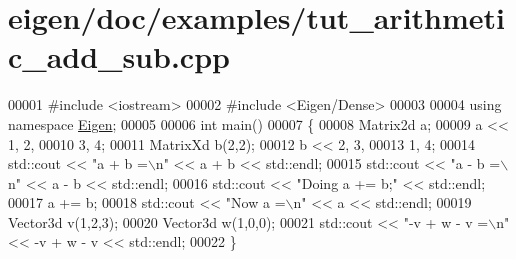 \hypertarget{eigen_2doc_2examples_2tut__arithmetic__add__sub_8cpp_source}{}\section{eigen/doc/examples/tut\+\_\+arithmetic\+\_\+add\+\_\+sub.cpp}
\label{eigen_2doc_2examples_2tut__arithmetic__add__sub_8cpp_source}

\begin{DoxyCode}
00001 \textcolor{preprocessor}{#include <iostream>}
00002 \textcolor{preprocessor}{#include <Eigen/Dense>}
00003 
00004 \textcolor{keyword}{using namespace }\hyperlink{namespace_eigen}{Eigen};
00005 
00006 \textcolor{keywordtype}{int} main()
00007 \{
00008   Matrix2d a;
00009   a << 1, 2,
00010        3, 4;
00011   MatrixXd b(2,2);
00012   b << 2, 3,
00013        1, 4;
00014   std::cout << \textcolor{stringliteral}{"a + b =\(\backslash\)n"} << a + b << std::endl;
00015   std::cout << \textcolor{stringliteral}{"a - b =\(\backslash\)n"} << a - b << std::endl;
00016   std::cout << \textcolor{stringliteral}{"Doing a += b;"} << std::endl;
00017   a += b;
00018   std::cout << \textcolor{stringliteral}{"Now a =\(\backslash\)n"} << a << std::endl;
00019   Vector3d v(1,2,3);
00020   Vector3d w(1,0,0);
00021   std::cout << \textcolor{stringliteral}{"-v + w - v =\(\backslash\)n"} << -v + w - v << std::endl;
00022 \}
\end{DoxyCode}
